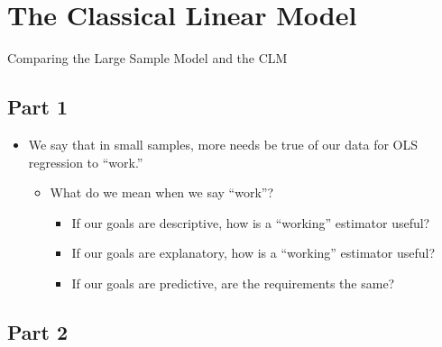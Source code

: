 \documentclass[
]{book}
\providecommand{\tightlist}{%
  \setlength{\itemsep}{0pt}\setlength{\parskip}{0pt}}
\theoremstyle{definition}
\theoremstyle{definition}
\theoremstyle{definition}
\theoremstyle{definition}
\theoremstyle{remark}
\begin{document}
\hypertarget{the-classical-linear-model-1}{%
\section{The Classical Linear Model}\label{the-classical-linear-model-1}}

Comparing the Large Sample Model and the CLM

\hypertarget{part-1-1}{%
\subsection{Part 1}\label{part-1-1}}

\begin{itemize}
\tightlist
\item
  We say that in small samples, more needs be true of our data for OLS regression to ``work.''

  \begin{itemize}
  \tightlist
  \item
    What do we mean when we say ``work''?

    \begin{itemize}
    \tightlist
    \item
      If our goals are descriptive, how is a ``working'' estimator useful?
    \item
      If our goals are explanatory, how is a ``working'' estimator useful?
    \item
      If our goals are predictive, are the requirements the same?
    \end{itemize}
  \end{itemize}
\end{itemize}

\hypertarget{part-2-1}{%
\subsection{Part 2}\label{part-2-1}}
\end{document}
